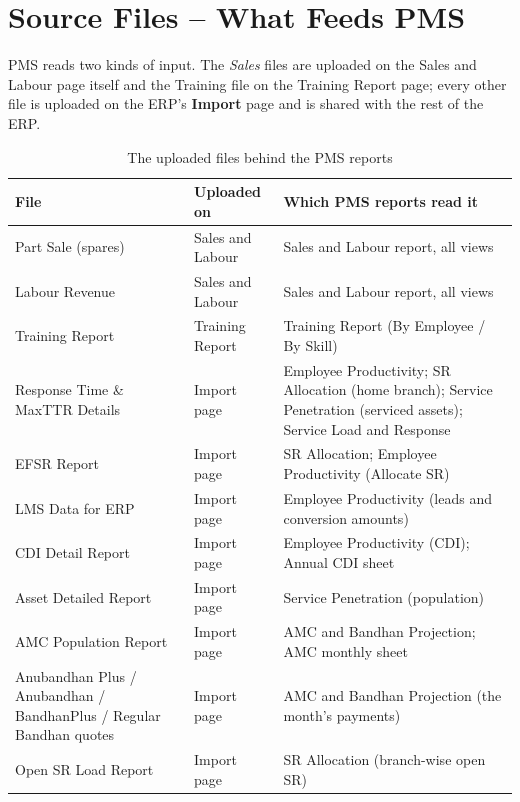 \documentclass[11pt,a4paper]{article}
\begin{document}
\section{Source Files -- What Feeds PMS}

PMS reads two kinds of input. The \emph{Sales} files are uploaded on the Sales and Labour
page itself and the Training file on the Training Report page; every other file is
uploaded on the ERP's \textbf{Import} page and is shared with the rest of the ERP.

\begin{table}[H]\centering\small
\begin{tabularx}{\linewidth}{@{}p{4.5cm}p{3.3cm}X@{}}
\toprule
\textbf{File} & \textbf{Uploaded on} & \textbf{Which PMS reports read it} \\
\midrule
Part Sale (spares) & Sales and Labour & Sales and Labour report, all views \\
Labour Revenue & Sales and Labour & Sales and Labour report, all views \\
Training Report & Training Report & Training Report (By Employee / By Skill) \\
\addlinespace
Response Time \& MaxTTR Details & Import page & Employee Productivity; SR Allocation (home
branch); Service Penetration (serviced assets); Service Load and Response \\
EFSR Report & Import page & SR Allocation; Employee Productivity (Allocate SR) \\
LMS Data for ERP & Import page & Employee Productivity (leads and conversion amounts) \\
CDI Detail Report & Import page & Employee Productivity (CDI); Annual CDI sheet \\
Asset Detailed Report & Import page & Service Penetration (population) \\
AMC Population Report & Import page & AMC and Bandhan Projection; AMC monthly sheet \\
Anubandhan Plus / Anubandhan / BandhanPlus / Regular Bandhan quotes &
Import page & AMC and Bandhan Projection (the month's payments) \\
Open SR Load Report & Import page & SR Allocation (branch-wise open SR) \\
\bottomrule
\end{tabularx}
\caption{The uploaded files behind the PMS reports}
\end{table}
\end{document}
